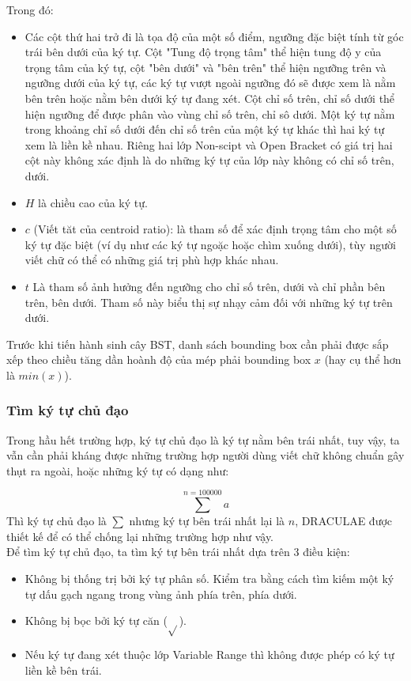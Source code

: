 \documentclass[a4paper,12pt]{article}
\begin{document}
	Trong đó:
	\begin{itemize}
		\item Các cột thứ hai trở đi là tọa độ của một số điểm, ngưỡng đặc biệt tính từ góc trái bên dưới của ký tự. Cột "Tung độ trọng tâm" thể hiện tung độ y của trọng tâm của ký tự, cột "bên dưới" và "bên trên" thể hiện ngưỡng trên và ngưỡng dưới của ký tự, các ký tự vượt ngoài ngưỡng đó sẽ được xem là nằm bên trên hoặc nằm bên dưới ký tự đang xét. Cột chỉ số trên, chỉ số dưới thể hiện ngưỡng để được phân vào vùng chỉ số trên, chỉ sô dưới. Một ký tự nằm trong khoảng chỉ số dưới đến chỉ số trên của một ký tự khác thì hai ký tự xem là liền kề nhau. Riêng hai lớp Non-scipt và Open Bracket có giá trị hai cột này không xác định là do những ký tự của lớp này không có chỉ số trên, dưới.
		\item $H$ là chiều cao của ký tự.
		\item $c$ (Viết tăt của centroid ratio): là tham số để xác định trọng tâm cho một số ký tự đặc biệt (ví dụ như các ký tự ngoặc hoặc chìm xuống dưới), tùy người viết chữ có thể có những giá trị phù hợp khác nhau.
		\item $t$ Là tham số ảnh hưởng đến ngưỡng cho chỉ số trên, dưới và chỉ phần bên trên, bên dưới. Tham số này biểu thị sự nhạy cảm đối với những ký tự trên dưới.
	\end{itemize}
	
	
	Trước khi tiến hành sinh cây BST, danh sách bounding box cần phải được sắp xếp theo chiều tăng dần hoành độ của mép phải bounding box $x$ (hay cụ thể hơn là $min(x)$). \\
	
	\subsubsection*{Tìm ký tự chủ đạo\cite{zanibbi}}
	
	Trong hầu hết trường hợp, ký tự chủ đạo\cite{zanibbi} là ký tự nằm bên trái nhất, tuy vậy, ta vẫn cần phải kháng được những trường hợp người dùng viết chữ không chuẩn gây thụt ra ngoài, hoặc những ký tự có dạng như:
	
	$$ \sum^{n = 100000} a $$
	Thì ký tự chủ đạo\cite{zanibbi} là $\sum$ nhưng ký tự bên trái nhất lại là $n$, DRACULAE\cite{zanibbi} được thiết kế để có thể chống lại những trường hợp như vậy.\\
	
	Để tìm ký tự chủ đạo\cite{zanibbi}, ta tìm ký tự bên trái nhất dựa trên 3 điều kiện:
	
	\begin{itemize}
		\item Không bị thống trị bởi ký tự phân số. Kiểm tra bằng cách tìm kiếm một ký tự dấu gạch ngang trong vùng ảnh phía trên, phía dưới.
		\item Không bị bọc bởi ký tự căn ($\sqrt{}$).
		\item Nếu ký tự đang xét thuộc lớp Variable Range thì không được phép có ký tự liền kề bên trái.
	\end{itemize}
	
\end{document}
